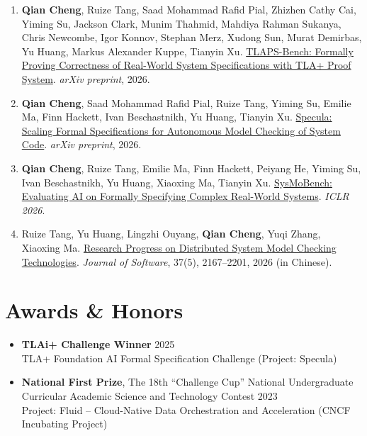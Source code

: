 \documentclass[11pt,a4paper]{article}
\begin{document}
\begin{enumerate}[leftmargin=*, nosep, topsep=2pt]
    \item \textbf{Qian Cheng}, Ruize Tang, Saad Mohammad Rafid Pial, Zhizhen Cathy Cai, Yiming Su, Jackson Clark, Munim Thahmid, Mahdiya Rahman Sukanya, Chris Newcombe, Igor Konnov, Stephan Merz, Xudong Sun, Murat Demirbas, Yu Huang, Markus Alexander Kuppe, Tianyin Xu. \href{https://arxiv.org/abs/2611.02849}{TLAPS-Bench: Formally Proving Correctness of Real-World System Specifications with TLA+ Proof System}. \textit{arXiv preprint}, 2026.

    \item \textbf{Qian Cheng}, Saad Mohammad Rafid Pial, Ruize Tang, Yiming Su, Emilie Ma, Finn Hackett, Ivan Beschastnikh, Yu Huang, Tianyin Xu. \href{https://arxiv.org/abs/2607.25333}{Specula: Scaling Formal Specifications for Autonomous Model Checking of System Code}. \textit{arXiv preprint}, 2026.

    \item \textbf{Qian Cheng}, Ruize Tang, Emilie Ma, Finn Hackett, Peiyang He, Yiming Su, Ivan Beschastnikh, Yu Huang, Xiaoxing Ma, Tianyin Xu. \href{https://proceedings.iclr.cc/paper_files/paper/2026/hash/438c34f45d7b5d82aef1b6016e695d5a-Abstract-Conference.html}{SysMoBench: Evaluating AI on Formally Specifying Complex Real-World Systems}. \textit{ICLR 2026}.

    \item Ruize Tang, Yu Huang, Lingzhi Ouyang, \textbf{Qian Cheng}, Yuqi Zhang, Xiaoxing Ma. \href{https://www.jos.org.cn/jos/article/abstract/7580}{Research Progress on Distributed System Model Checking Technologies}. \textit{Journal of Software}, 37(5), 2167--2201, 2026 (in Chinese).
\end{enumerate}

\section{Awards \& Honors}

\begin{itemize}[leftmargin=*, nosep, topsep=2pt]
    \item \textbf{TLAi+ Challenge Winner} \hfill 2025\\
    TLA+ Foundation AI Formal Specification Challenge (Project: Specula)

    \item \textbf{National First Prize}, The 18th ``Challenge Cup'' National Undergraduate Curricular Academic Science and Technology Contest \hfill 2023\\
    Project: Fluid -- Cloud-Native Data Orchestration and Acceleration (CNCF Incubating Project)
\end{itemize}
\end{document}
